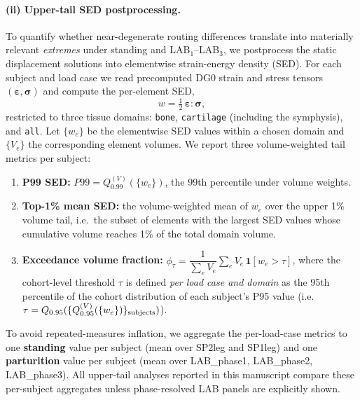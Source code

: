 \documentclass[11pt]{article}
\begin{document}
\paragraph{(ii) Upper-tail SED postprocessing.}
To quantify whether near-degenerate routing differences translate into materially relevant \emph{extremes} under standing and LAB$_1$--LAB$_3$, we postprocess the static displacement solutions into elementwise strain-energy density (SED).
For each subject and load case we read precomputed DG0 strain and stress tensors $(\bm\varepsilon,\bm\sigma)$ and compute the per-element SED,
\begin{equation}
w = \tfrac12\,\bm\varepsilon:\bm\sigma,
\end{equation}
restricted to three tissue domains: \texttt{bone}, \texttt{cartilage} (including the symphysis), and \texttt{all}.
Let $\{w_e\}$ be the elementwise SED values within a chosen domain and $\{V_e\}$ the corresponding element volumes.
We report three volume-weighted tail metrics per subject:
\begin{enumerate}[leftmargin=1.8em]
\item \textbf{P99 SED:} $P99 = Q_{0.99}^{(V)}(\{w_e\})$, the 99th percentile under volume weights.
\item \textbf{Top-1\% mean SED:} the volume-weighted mean of $w_e$ over the upper 1\% volume tail, i.e.\ the subset of elements with the largest SED values whose cumulative volume reaches 1\% of the total domain volume.
\item \textbf{Exceedance volume fraction:} $\phi_\tau = \dfrac{1}{\sum_e V_e}\sum_e V_e\,\mathbf 1[w_e>\tau]$, where the cohort-level threshold $\tau$ is defined \emph{per load case and domain} as the 95th percentile of the cohort distribution of each subject's P95 value (i.e.\ $\tau=Q_{0.95}(\{Q_{0.95}^{(V)}(\{w_e\})\}_{\rm subjects})$).
\end{enumerate}
To avoid repeated-measures inflation, we aggregate the per-load-case metrics to one \textbf{standing} value per subject (mean over SP2leg and SP1leg) and one \textbf{parturition} value per subject (mean over LAB\_phase1, LAB\_phase2, LAB\_phase3).
All upper-tail analyses reported in this manuscript compare these per-subject aggregates unless phase-resolved LAB panels are explicitly shown.

\end{document}
